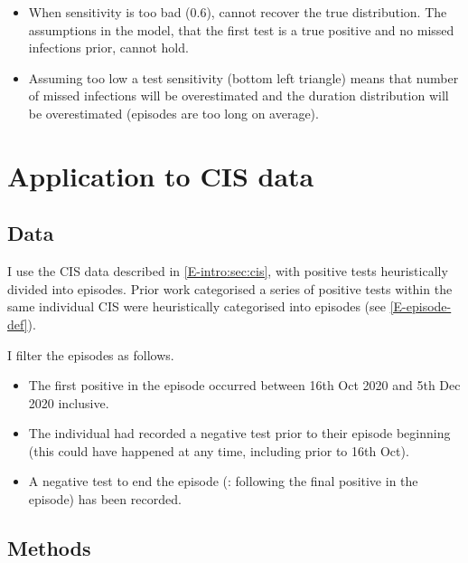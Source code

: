 \documentclass[thesis.tex]{subfiles}
\begin{document}

\begin{itemize}
  \item When sensitivity is too bad (0.6), cannot recover the true distribution. The assumptions in the model, that the first test is a true positive and no missed infections prior, cannot hold.
  \item Assuming too low a test sensitivity (bottom left triangle) means that number of missed infections will be overestimated and the duration distribution will be overestimated (\ie episodes are too long on average).
\end{itemize}

\section{Application to CIS data} \label{imperf-test:sec:application}

\subsection{Data}


I use the CIS data described in \cref{E-intro:sec:cis}, with positive tests heuristically divided into episodes.
Prior work categorised a series of positive tests within the same individual CIS were heuristically categorised into episodes (see \cref{E-episode-def}).

I filter the episodes as follows.
\begin{itemize}
\item
  The first positive in the episode occurred between 16th Oct 2020 and
  5th Dec 2020 inclusive.
\item
  The individual had recorded a negative test prior to their episode
  beginning (this could have happened at any time, including prior to
  16th Oct).
\item
  A negative test to end the episode (\ie: following the final positive in the episode) has been recorded.
\end{itemize}


\subsection{Methods}
\end{document}
